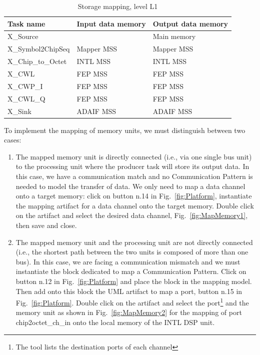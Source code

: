 \documentclass{llncs}
\begin{document}
\begin{table}
\centering
\caption{Storage mapping, level L1}
\label{tab:MappingL1}
\begin{tabular}{| >{\centering\arraybackslash}l | >{\centering\arraybackslash}l | >{\centering\arraybackslash}l |}
	\hline
		\textbf{Task name}		& \textbf{Input data memory} & \textbf{Output data memory} \\ \hline
		X\_Source							& 							& Main memory	\\ \hline
		X\_Symbol2ChipSeq			& Mapper MSS		& Mapper MSS	\\ \hline
		X\_Chip\_to\_Octet		&	INTL MSS			& INTL MSS	\\ \hline
		X\_CWL								&	FEP MSS				& FEP MSS		\\ \hline
		X\_CWP\_I							&	FEP MSS				& FEP MSS		\\ \hline
		X\_CWL\_Q							&	FEP MSS				& FEP MSS		\\ \hline
		X\_Sink								&	ADAIF MSS			& ADAIF MSS	\\ \hline
\end{tabular}
\end{table}
%
To implement the mapping of memory units, we must distinguish between two cases:
\begin{enumerate}
	\item The mapped memory unit is directly connected (i.e., via one single bus unit) to the processing unit where
	the producer task will store its output data. In this case, we have a communication match and no
	Communication Pattern is needed to model the transfer of data. We only need to map a data channel onto a target
	memory: click on button n.14 in Fig.~\ref{fig:Platform}, instantiate the mapping artifact for a data channel onto
    the target memory. Double click on the artifact and select the desired data channel, Fig.~\ref{fig:MapMemory1}, then
    save and close.
	\item The mapped memory unit and the processing unit are not directly connected (i.e., the shortest path between
	the two units is composed of more than one bus). In this case, we are facing a communication mismatch and we
	must instantiate the block dedicated to map a Communication Pattern. Click on button n.12 in
	Fig.~\ref{fig:Platform} and place the block in the mapping model. Then add onto this block the UML artifact to
	map a port, button n.15 in Fig.~\ref{fig:Platform}. Double click on the artifact and select the
	port\footnote{The tool lists the destination ports of each channel} and the memory unit as shown in
	Fig.~\ref{fig:MapMemory2} for the mapping of port chip2octet\_ch\_in onto the local memory of the INTL DSP
	unit.
\end{enumerate}
\end{document}
